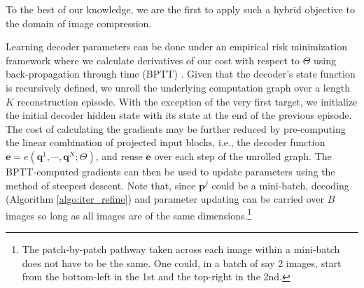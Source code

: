 \documentclass[smallabstract,smallcaptions]{dccpaper}
\begin{document}
To the best of our knowledge, we are the first to apply such a hybrid objective to the domain of image compression.  

Learning decoder parameters can be done under an empirical risk minimization framework where we calculate derivatives of our cost with respect to $\Theta$ using back-propagation through time (BPTT) \cite{werbos1988bptt}. Given that the decoder's state function is recursively defined, we unroll the underlying computation graph over a length $K$ reconstruction episode. With the exception of the very first target, we initialize the initial decoder hidden state with its state at the end of the previous episode. The cost of calculating the gradients may be further reduced by pre-computing the linear combination of projected input blocks, i.e., the decoder function $\mathbf{e} = e(\mathbf{q}^1, \cdots, \mathbf{q}^N ; \Theta)$, and reuse $\mathbf{e}$ over each step of the unrolled graph. The BPTT-computed gradients can then be used to update parameters using the method of steepest descent. 
Note that, since $\mathbf{p}^j$ could be a mini-batch, decoding (Algorithm \ref{algo:iter_refine}) and parameter updating can be carried over $B$ images so long as all images are of the same dimensions.\footnote{The patch-by-patch pathway taken across each image within a mini-batch does not have to be the same. One could, in a batch of say 2 images, start from the bottom-left in the 1st and the top-right in the 2nd.%
} 
\end{document}
